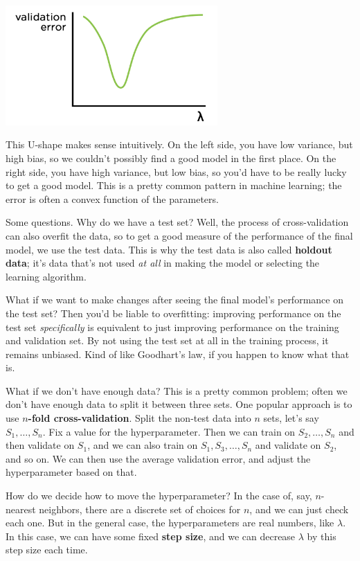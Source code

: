 \documentclass[11pt,paper=letter]{scrartcl}
\begin{document}
\begin{center}
  \includegraphics[height=1.8in]{22.png}
\end{center}

This U-shape makes sense intuitively. On the left side, you have low variance, but high bias, so we couldn't possibly find a good model in the first place. On the right side, you have high variance, but low bias, so you'd have to be really lucky to get a good model. This is a pretty common pattern in machine learning; the error is often a convex function of the parameters.

Some questions. Why do we have a test set? Well, the process of cross-validation can also overfit the data, so to get a good measure of the performance of the final model, we use the test data. This is why the test data is also called \textbf{holdout data}; it's data that's not used \textit{at all} in making the model or selecting the learning algorithm.

What if we want to make changes after seeing the final model's performance on the test set? Then you'd be liable to overfitting: improving performance on the test set \textit{specifically} is equivalent to just improving performance on the training and validation set. By not using the test set at all in the training process, it remains unbiased. Kind of like Goodhart's law, if you happen to know what that is.

What if we don't have enough data? This is a pretty common problem; often we don't have enough data to split it between three sets. One popular approach is to use \textbf{$n$-fold cross-validation}. Split the non-test data into $n$ sets, let's say $S_1, \ldots, S_n$. Fix a value for the hyperparameter. Then we can train on $S_2, \ldots, S_n$ and then validate on $S_1$, and we can also train on $S_1, S_3, \ldots, S_n$ and validate on $S_2$, and so on. We can then use the average validation error, and adjust the hyperparameter based on that.

How do we decide how to move the hyperparameter? In the case of, say, $n$-nearest neighbors, there are a discrete set of choices for $n$, and we can just check each one. But in the general case, the hyperparameters are real numbers, like $\lambda$. In this case, we can have some fixed \textbf{step size}, and we can decrease $\lambda$ by this step size each time.
\end{document}

